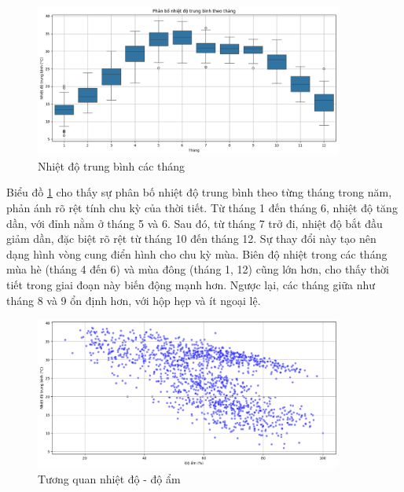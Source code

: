      \begin{figure}[htp]
        \centering
        \includegraphics[width=0.90\textwidth]{images/TS_weather_boxplot_month_meantemp.png}
        \caption{Nhiệt độ trung bình các tháng}
        \label{fig:TS_weather_boxplot_month_meantemp}
    \end{figure}
    \FloatBarrier

    Biểu đồ \ref{fig:TS_weather_boxplot_month_meantemp} cho thấy sự phân bố nhiệt độ trung bình theo từng tháng trong năm, phản ánh rõ rệt tính chu kỳ của thời tiết. Từ tháng 1 đến tháng 6, nhiệt độ tăng dần, với đỉnh nằm ở tháng 5 và 6. Sau đó, từ tháng 7 trở đi, nhiệt độ bắt đầu giảm dần, đặc biệt rõ rệt từ tháng 10 đến tháng 12. Sự thay đổi này tạo nên dạng hình vòng cung điển hình cho chu kỳ mùa. Biên độ nhiệt trong các tháng mùa hè (tháng 4 đến 6) và mùa đông (tháng 1, 12) cũng lớn hơn, cho thấy thời tiết trong giai đoạn này biến động mạnh hơn. Ngược lại, các tháng giữa như tháng 8 và 9 ổn định hơn, với hộp hẹp và ít ngoại lệ.

    \begin{figure}[htp]
        \centering
        \includegraphics[width=0.90\textwidth]{images/TS_weather_meantemp_humid.png}
        \caption{Tương quan nhiệt độ - độ ẩm}
        \label{fig:TS_weather_meantemp_humid}
    \end{figure}
    \FloatBarrier

